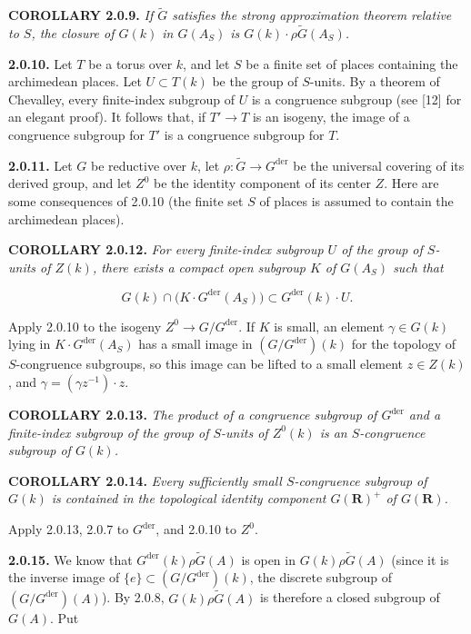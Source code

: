 \documentclass[10pt,a4paper]{article}
\newcommand{\SourcePage}[2]{\clearpage\setcounter{page}{#2}\typeout{D031_SOURCE_PAGE physical=#1 printed=#2}}
\begin{document}
\textbf{COROLLARY 2.0.9.} \emph{If \(\widetilde G\) satisfies the strong approximation theorem relative to \(S\), the closure of \(G(k)\) in \(G(A_S)\) is \(G(k)\cdot\rho\widetilde G(A_S)\).}

\textbf{2.0.10.} Let \(T\) be a torus over \(k\), and let \(S\) be a finite set of places containing the archimedean places. Let \(U\subset T(k)\) be the group of \(S\)-units. By a theorem of Chevalley, every finite-index subgroup of \(U\) is a congruence subgroup (see {[}12{]} for an elegant proof). It follows that, if \(T'\to T\) is an isogeny, the image of a congruence subgroup for \(T'\) is a congruence subgroup for \(T\).

\textbf{2.0.11.} Let \(G\) be reductive over \(k\), let \(\rho:\widetilde G\to G^{\mathrm{der}}\) be the universal covering of its derived group, and let \(Z^0\) be the identity component of its center \(Z\). Here are some consequences of 2.0.10 (the finite set \(S\) of places is assumed to contain the archimedean places).

\textbf{COROLLARY 2.0.12.} \emph{For every finite-index subgroup \(U\) of the group of \(S\)-units of \(Z(k)\), there exists a compact open subgroup \(K\) of \(G(A_S)\) such that}

\[
G(k)\cap\bigl(K\cdot G^{\mathrm{der}}(A_S)\bigr)\subset G^{\mathrm{der}}(k)\cdot U.
\]

Apply 2.0.10 to the isogeny \(Z^0\to G/G^{\mathrm{der}}\). If \(K\) is small, an element \(\gamma\in G(k)\) lying in \(K\cdot G^{\mathrm{der}}(A_S)\) has a small image in \((G/G^{\mathrm{der}})(k)\) for the topology of \(S\)-congruence subgroups, so this image can be lifted to a small element \(z\in Z(k)\), and \(\gamma=(\gamma z^{-1})\cdot z\).

\textbf{COROLLARY 2.0.13.} \emph{The product of a congruence subgroup of \(G^{\mathrm{der}}\) and a finite-index subgroup of the group of \(S\)-units of \(Z^0(k)\) is an \(S\)-congruence subgroup of \(G(k)\).}

\SourcePage{19}{265}
\textbf{COROLLARY 2.0.14.} \emph{Every sufficiently small \(S\)-congruence subgroup of \(G(k)\) is contained in the topological identity component \(G(\mathbf R)^+\) of \(G(\mathbf R)\).}

Apply 2.0.13, 2.0.7 to \(G^{\mathrm{der}}\), and 2.0.10 to \(Z^0\).

\textbf{2.0.15.} We know that \(G^{\mathrm{der}}(k)\rho\widetilde G(A)\) is open in \(G(k)\rho\widetilde G(A)\) (since it is the inverse image of \(\{e\}\subset (G/G^{\mathrm{der}})(k)\), the discrete subgroup of \((G/G^{\mathrm{der}})(A)\)). By 2.0.8, \(G(k)\rho\widetilde G(A)\) is therefore a closed subgroup of \(G(A)\). Put
\end{document}
